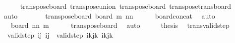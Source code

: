 \begin{isabellebody}
\ \ \ \ \isamarkupfalse%
\ transpose{\isacharunderscore}{\kern0pt}board{}\ transpose{\isacharunderscore}{\kern0pt}union\ transpose{\isacharunderscore}{\kern0pt}board\ transpose{\isacharunderscore}{\kern0pt}trans{\isacharunderscore}{\kern0pt}board\ \isamarkupfalse%
\ auto\isanewline
\ \ \isamarkupfalse%
\ \isamarkupfalse%
\ {\isachardoublequoteopen}{\isachardot}{\kern0pt}{\isachardot}{\kern0pt}{\isachardot}{\kern0pt}\ {\isacharequal}{\kern0pt}\ transpose{\isacharunderscore}{\kern0pt}board\ {\isacharparenleft}{\kern0pt}board\ m\ {\isacharparenleft}{\kern0pt}nn\isanewline
\ \ \ \ \isamarkupfalse%
\ board{\isacharunderscore}{\kern0pt}concat\ \isamarkupfalse%
\ auto\isanewline
\ \ \isamarkupfalse%
\ \isamarkupfalse%
\ {\isachardoublequoteopen}{\isachardot}{\kern0pt}{\isachardot}{\kern0pt}{\isachardot}{\kern0pt}\ {\isacharequal}{\kern0pt}\ board\ {\isacharparenleft}{\kern0pt}nn\ m{\isachardoublequoteclose}\isanewline
\ \ \ \ \isamarkupfalse%
\ transpose{\isacharunderscore}{\kern0pt}board\ \isamarkupfalse%
\ auto\isanewline
\ \ \isamarkupfalse%
\ \isamarkupfalse%
\ {\isacharquery}{\kern0pt}thesis\ \isacommand{{\isachardot}{\kern0pt}}\isamarkupfalse%
\isanewline
{}\isamarkupfalse%
%
\endisatagproof
{\isafoldproof}%
%
\isadelimproof
\isanewline
%
\endisadelimproof
\isanewline
{}\isamarkupfalse%
\ trans{\isacharunderscore}{\kern0pt}valid{\isacharunderscore}{\kern0pt}step{\isacharcolon}{\kern0pt}\ \isanewline
\ \ {\isachardoublequoteopen}valid{\isacharunderscore}{\kern0pt}step\ {\isacharparenleft}{\kern0pt}i{\isacharcomma}{\kern0pt}j{\isacharparenright}{\kern0pt}\ {\isacharparenleft}{\kern0pt}i{\isacharprime}{\kern0pt}{\isacharcomma}{\kern0pt}j{\isacharprime}{\kern0pt}{\isacharparenright}{\kern0pt}\ {\isasymLongrightarrow}\ valid{\isacharunderscore}{\kern0pt}step\ {\isacharparenleft}{\kern0pt}i{\isacharplus}{\kern0pt}kj{\isacharplus}{\kern0pt}k\ {\isacharparenleft}{\kern0pt}i{\isacharprime}{\kern0pt}{\isacharplus}{\kern0pt}kj{\isacharprime}{\kern0pt}{\isacharplus}{\kern0pt}k\isanewline

\end{isabellebody}
